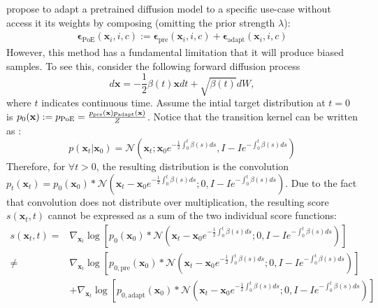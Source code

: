 \cite{yang2024probabilistic} propose to adapt a pretrained diffusion model to a specific use-case without access it its weights by composing (omitting the prior strength $\lambda$):
%
\begin{align}
\mathbf{\epsilon}_{\text{PoE}} (\mathbf{x}_i, i, c) := 
\mathbf{\epsilon}_{\text{pre}} (\mathbf{x}_i, i, c) + \mathbf{\epsilon}_{\text{adapt}} (\mathbf{x}_i, i, c) \label{eq: yang}
\end{align}
However, this method has a fundamental limitation that it will produce biased samples. To see this, consider the following forward diffusion process 
$$d\mathbf{x} = -\frac{1}{2} \beta(t) \mathbf{x} dt + \sqrt{\beta(t)} dW, $$
where $t$ indicates continuous time. Assume the intial target distribution at $t=0$ is $p_0(\mathbf{x}) := p_\textnormal{PoE} = \frac{p_{\text{pre}}(\mathbf{x})p_{\text{adapt}}(\mathbf{x})}{Z}$. 
%
Notice that the transition kernel can be written as \citep{sarkka2019applied}:
$$p(\mathbf{x}_t|\mathbf{x}_0) = \mathcal{N}(\mathbf{x}_t; \mathbf{x}_0 e^{-\frac{1}{2} \int_0^t \beta(s) ds }, I-I e^{- \int_0^t \beta(s) ds})$$
Therefore, for $\forall t>0$, the resulting distribution is the convolution $p_t(\mathbf{x}_t) = p_0(\mathbf{x}_0) * \mathcal{N}(\mathbf{x}_t - \mathbf{x}_0 e^{-\frac{1}{2} \int_0^t \beta(s) ds }; 0, I-I e^{- \int_0^t \beta(s) ds})$. 
%
Due to the fact that convolution does not distribute over multiplication, the resulting score $s(\mathbf{x}_t, t)$ cannot be expressed as a sum of the two individual score functions:
\begin{align*}
s(\mathbf{x}_t, t)  = & \nabla_{\mathbf{x}_t} \log \left [p_0(\mathbf{x}_0) * \mathcal{N}(\mathbf{x}_t - \mathbf{x}_0 e^{-\frac{1}{2} \int_0^t \beta(s) ds }; 0, I-I e^{- \int_0^t \beta(s) ds}) \right ] \\
 \neq  & \nabla_{\mathbf{x}_t} \log \left [ p_{0, \text{pre}}(\mathbf{x}_0) * \mathcal{N}(\mathbf{x}_t - \mathbf{x}_0 e^{-\frac{1}{2} \int_0^t \beta(s) ds }; 0, I-I e^{- \int_0^t \beta(s) ds}) \right ] \\
& + \nabla_{\mathbf{x}_t} \log \left [ p_{0, \text{adapt}}(\mathbf{x}_0) * \mathcal{N}(\mathbf{x}_t - \mathbf{x}_0 e^{-\frac{1}{2} \int_0^t \beta(s) ds }; 0, I-I e^{- \int_0^t \beta(s) ds}) \right ]
\end{align*}
